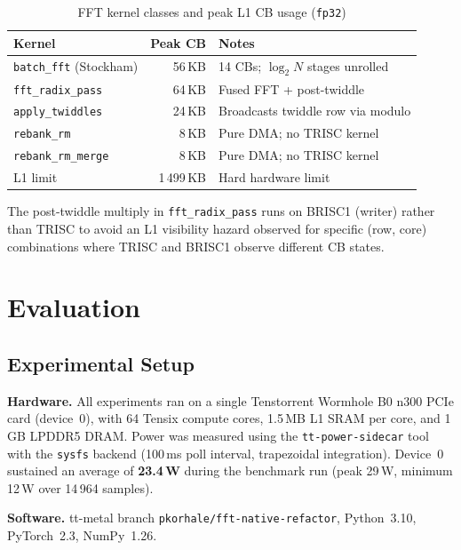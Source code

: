 \documentclass[conference]{IEEEtran}
\begin{document}
\begin{table}[t]
  \caption{FFT kernel classes and peak L1 CB usage (\texttt{fp32})}
  \label{tab:kernels}
  \centering
  \begin{tabular}{lrp{3.4cm}}
    \toprule
    Kernel & Peak CB & Notes \\
    \midrule
    \texttt{batch\_fft} (Stockham)  & 56\,KB  & 14 CBs; $\log_2 N$ stages unrolled \\
    \texttt{fft\_radix\_pass}       & 64\,KB  & Fused FFT + post-twiddle \\
    \texttt{apply\_twiddles}        & 24\,KB  & Broadcasts twiddle row via modulo \\
    \texttt{rebank\_rm}             & 8\,KB   & Pure DMA; no TRISC kernel \\
    \texttt{rebank\_rm\_merge}      & 8\,KB   & Pure DMA; no TRISC kernel \\
    \midrule
    L1 limit                        & 1\,499\,KB & Hard hardware limit \\
    \bottomrule
  \end{tabular}
\end{table}

The post-twiddle multiply in \texttt{fft\_radix\_pass} runs on BRISC1 (writer)
rather than TRISC to avoid an L1 visibility hazard observed for specific
(row, core) combinations where TRISC and BRISC1 observe different CB states.

\section{Evaluation}
\label{sec:evaluation}

\subsection{Experimental Setup}

\textbf{Hardware.}
All experiments ran on a single Tenstorrent Wormhole B0 n300 PCIe card
(device~0), with 64 Tensix compute cores, 1.5\,MB L1 SRAM per core, and 1\,GB
LPDDR5 DRAM. Power was measured using the \texttt{tt-power-sidecar} tool with
the \texttt{sysfs} backend (100\,ms poll interval, trapezoidal integration).
Device~0 sustained an average of \textbf{23.4\,W} during the benchmark run
(peak 29\,W, minimum 12\,W over 14\,964 samples).

\textbf{Software.}
tt-metal branch \texttt{pkorhale/fft-native-refactor}, Python~3.10,
PyTorch~2.3, NumPy~1.26.
\end{document}
